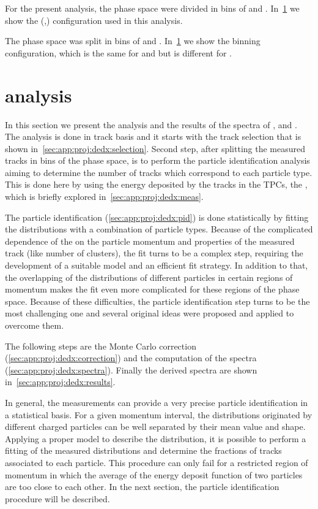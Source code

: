
For the present analysis, the phase space were divided
in bins of \p and \pT. In~\cref{}
we show the (\p,\pT) configuration used in this analysis.

The phase space was split in bins of \p and \pT.
In~\cref{} we show the binning configuration, which
is the same for \lamb and \antilamb but is different
for \kzeros.


\section{\dedx analysis}


In this section we present the analysis and the results
of the spectra of \pions, \kaons and \protons.
The analysis is done in track basis and it starts
with the track selection that is shown in~\cref{sec:app:proj:dedx:selection}.
Second step, after splitting the measured tracks in bins of the phase
space, is to perform the particle identification analysis
aiming to determine the number of tracks which correspond
to each particle type. This is done here by using the
energy deposited by the tracks in the TPCs, the \dedx,
which is briefly explored in~\cref{sec:app:proj:dedx:meas}.


The particle identification (\cref{sec:app:proj:dedx:pid})
is done statistically by fitting
the \dedx distributions with a combination of particle
types. Because of the complicated dependence of the \dedx
on the particle momentum and properties of the measured track
(like number of clusters), the \dedx fit turns to be
a complex step, requiring the development of a suitable
\dedx model and an efficient \dedx fit strategy.
In addition to that, the overlapping of the \dedx distributions
of different particles in certain regions of momentum
makes the \dedx fit even more complicated for these
regions of the phase space.
Because of these difficulties, the particle identification
step turns to be the most challenging one and several
original ideas were proposed and applied to overcome them. 


The following steps are the Monte Carlo correction (\cref{sec:app:proj:dedx:correction})
and the computation of the spectra (\cref{sec:app:proj:dedx:spectra}).
Finally the derived spectra are shown in~\cref{sec:app:proj:dedx:results}. 

In general, the \dedx measurements can provide a very precise
particle identification in a statistical basis. For a given
momentum interval, the \dedx distributions originated by
different charged particles can be well separated by their
mean value and shape. Applying a proper model to describe
the \dedx distribution, it is possible to perform a fitting
of the measured distributions and determine the fractions of
tracks associated to each particle. This procedure can only fail
for a restricted region of momentum in which the average of
the energy deposit function of two particles are too close to
each other. In the next section, the particle
identification procedure will be described. 


